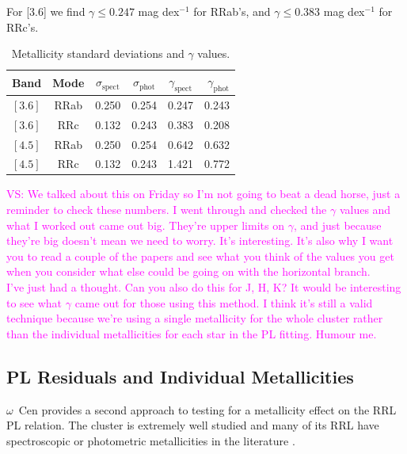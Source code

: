 \documentclass[a4paper,fleqn,usenatbib]{mnras}
\providecommand{\vscomment}[1]{{\textcolor{magenta}{{VS: #1}}}\xspace}
\begin{document}
For [3.6] we find $\gamma \leq 0.247$ mag dex$^{-1}$ for RRab's, and $\gamma \leq 0.383$ mag dex$^{-1}$ for RRc's.

\begin{table}
\centering
\caption{Metallicity standard deviations and $\gamma$ values.}
\label{tab:gamma}
\begin{tabular}{lccccr} 
\hline \hline
Band & Mode & $\sigma_{\text{spect}}$ & $\sigma_{\text{phot}}$ & $\gamma_{\text{spect}}$ & $\gamma_{\text{phot}}$ \\
\hline
$[3.6]$ & RRab & 0.250 & 0.254 & 0.247 & 0.243 \\ %
$[3.6]$ & RRc & 0.132 & 0.243 & 0.383 & 0.208 \\ %
$[4.5]$ & RRab & 0.250 & 0.254 & 0.642 & 0.632 \\ %
$[4.5]$ & RRc & 0.132 & 0.243 & 1.421 & 0.772 \\ %
\hline
\end{tabular}
\end{table}

\vscomment{We talked about this on Friday so I'm not going to beat a dead horse, just a reminder to check these numbers. I went through and checked the $\gamma$ values and what I worked out came out big. They're upper limits on $\gamma$, and just because they're big doesn't mean we need to worry. It's interesting. It's also why I want you to read a couple of the papers and see what you think of the values you get when you consider what else could be going on with the horizontal branch.\\ I've just had a thought. Can you also do this for J, H, K? It would be interesting to see what $\gamma$ came out for those using this method. I think it's still a valid technique because we're using a single metallicity for the whole cluster rather than the individual metallicities for each star in the PL fitting. Humour me. }

\subsection{PL Residuals and Individual Metallicities}
\label{sec:residuals}

$\omega$~Cen provides a second approach to testing for a metallicity effect on the RRL PL relation. The cluster is extremely well studied and many of its RRL have spectroscopic or photometric metallicities in the literature \citep[e.g.][]{2006ApJ...640L..43S, 2000AJ....119.1824R}. 
\end{document}
